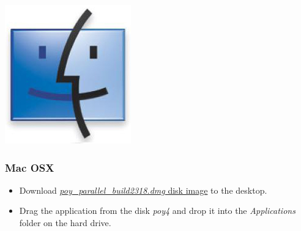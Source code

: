 \begin{flushleft}
	\begin{minipage}[c]{0.074\textwidth}
   		\includegraphics[width=\textwidth]{figures/figlogomac.jpg}
	\end{minipage}
	\quad
	\begin{minipage}[t]{0.88\textwidth}
	   	\subsubsection{Mac OSX}
	\end{minipage}
	            \begin{itemize}
			\item Download
            \href{http://research.amnh.org/scicomp/projects/poy.php}{\emph{poy\_parallel\_build2318.dmg} disk image} to the desktop.
            		\item Drag the \poy application from the
            disk \emph{poy4} and drop it into the \emph{Applications}
            folder on the hard drive.
		\end{itemize}


\end{flushleft}
